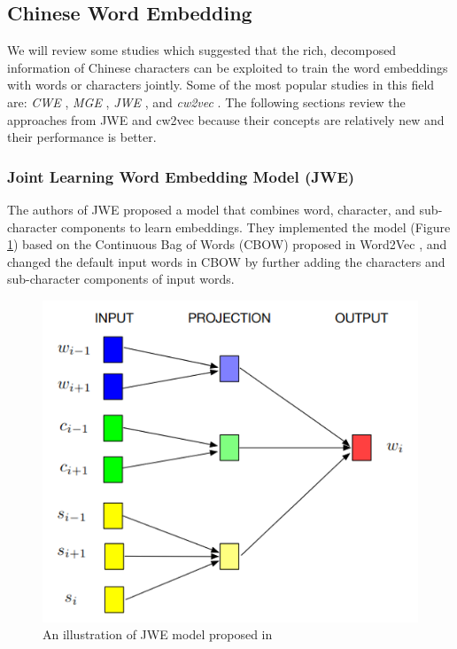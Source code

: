 \subsection{Chinese Word Embedding} \label{sec:rw_cwe}

We will review some studies which suggested that the rich, decomposed information of Chinese characters can be exploited to train the word embeddings with words or characters jointly. Some of the most popular studies in this field are: \textit{CWE} \cite{chen2015joint}, \textit{MGE} \cite{yin2016multi}, \textit{JWE} \cite{yu2017joint}, and \textit{cw2vec} \cite{cao2018cw2vec}. The following sections review the approaches from JWE and cw2vec because their concepts are relatively new and their performance is better.

\subsubsection{Joint Learning Word Embedding Model (JWE)}

The authors of JWE \cite{yu2017joint} proposed a model that combines word, character, and sub-character components to learn embeddings. They implemented the model (Figure \ref{fig:jwe}) based on the Continuous Bag of Words (CBOW) proposed in Word2Vec \cite{mikolov2013distributed}, and changed the default input words in CBOW by further adding the characters and sub-character components of input words.

\begin{figure}[h]
	\centering
	\includegraphics[scale=0.7]{../images/jwe_illustration.png}
	\caption{An illustration of JWE model proposed in \cite{yu2017joint}}
	\label{fig:jwe}
\end{figure}


